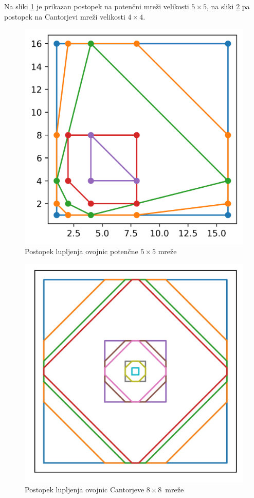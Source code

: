 \documentclass[a4paper]{article}
\begin{document}
\newpage
Na sliki \ref{fig:5x5} je prikazan postopek na potenčni mreži velikosti $5 \times 5$, na sliki \ref{fig:cantor} pa postopek na Cantorjevi mreži velikosti $4 \times 4$.

\begin{figure}[!h]
	\centering
	\caption{Postopek lupljenja ovojnic potenčne $5 \times 5$ mreže}
	\label{fig:5x5}
	\includegraphics[scale=0.8]{slike/5x5_potencna.png}
\end{figure}

\begin{figure}[!h]
	\centering
	\caption{Postopek lupljenja ovojnic Cantorjeve $8 \times 8$~mreže}
	\label{fig:cantor}
	\includegraphics[scale=0.8]{slike/kvazi_cantor.jpg}
\end{figure}
\pagebreak
\end{document}
